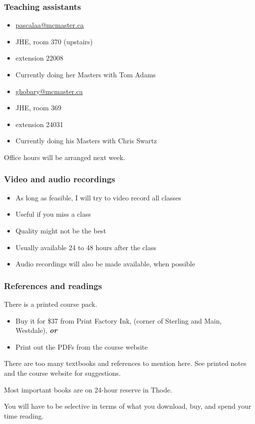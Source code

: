\begin{frame}\frametitle{Teaching assistants}
	{\color{myGreen}{Alicia Pascall}}
	\begin{itemize}
		\item	\url{pascalaa@mcmaster.ca}
		\item	JHE, room 370 (upstairs)
		\item	extension 22008
		\item	Currently doing her Masters with Tom Adams
	\end{itemize}
	\vspace{12pt}
	{\color{myGreen}{Yasser Ghobara}}
	\begin{itemize}
		\item	\url{ghobary@mcmaster.ca}
		\item	JHE, room 369
		\item	extension 24031
		\item	Currently doing his Masters with Chris Swartz
	\end{itemize}
	\vspace{12pt}
	Office hours will be arranged next week.
\end{frame}

\begin{frame}\frametitle{Video and audio recordings}
	\begin{itemize}
		\item	As long as feasible, I will try to video record all classes
		\item	Useful if you miss a class
		\item	Quality might not be the best
		\item	Usually available 24 to 48 hours after the class
		\item	Audio recordings will also be made available, when possible
	\end{itemize}
\end{frame}

\begin{frame}\frametitle{References and readings}
	
	There is a printed course pack.
	\vspace{12pt}
	\begin{itemize}
		\item	Buy it for \$37 from Print Factory Ink, (corner of Sterling and Main, Westdale), \emph{\textbf{or}}
		\item	Print out the PDFs from the course website
	\end{itemize}
	\vspace{12pt}
	There are too many textbooks and references to mention here. See printed notes and the course website for suggestions.
	\vspace{12pt}
	
	Most important books are on 24-hour reserve in Thode.
	\vspace{6pt}
	
	You will have to be selective in terms of what you download, buy, and spend your time reading.
\end{frame}

